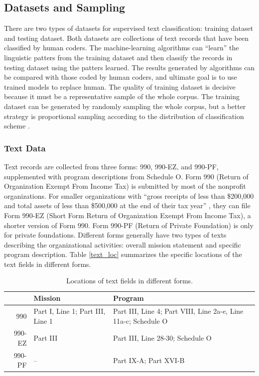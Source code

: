\documentclass[12pt]{article}
\begin{document}
\subsection{Datasets and Sampling}

There are two types of datasets for supervised text classification: training dataset and testing dataset. Both datasets are collections of text records that have been classified by human coders. The machine-learning algorithms can ``learn'' the linguistic patters from the training dataset and then classify the records in testing dataset using the patters learned. The results generated by algorithms can be compared with those coded by human coders, and ultimate goal is to use trained models to replace human. The quality of training dataset is decisive because it must be a representative sample of the whole corpus. The training dataset can be generated by randomly sampling the whole corpus, but a better strategy is proportional sampling according to the distribution of classification scheme \parencite[278]{GrimmerTextDataPromise2013}.

\subsubsection{Text Data}

Text records are collected from three forms: 990, 990-EZ, and 990-PF, supplemented with program descriptions from Schedule O. Form 990 (Return of Organization Exempt From Income Tax) is submitted by most of the nonprofit organizations. For smaller organizations with ``gross receipts of less than \$200,000 and total assets of less than \$500,000 at the end of their tax year'' \parencite[1]{USInternalRevenueService2017InstructionsForm2018}, they can file Form 990-EZ (Short Form Return of Organization Exempt From Income Tax), a shorter version of Form 990. Form 990-PF (Return of Private Foundation) is only for private foundations. Different forms generally have two types of texts describing the organizational activities: overall mission statement and specific program description. Table \ref{text_loc} summarizes the specific locations of the text fields in different forms.

\begin{table}[]
    \centering
    \begin{tabularx}{\textwidth}{r|X|X}
         & Mission & Program \\
         \hline
         990 & Part I, Line 1; Part III, Line 1 & Part III, Line 4; Part VIII, Line 2a-e, Line 11a-c; Schedule O \\
         990-EZ & Part III & Part III, Line 28-30; Schedule O \\
         990-PF & -- & Part IX-A; Part XVI-B \\
    \end{tabularx}
    \caption{Locations of text fields in different forms.} \label{text_loc}
    \label{tab:my_label}
\end{table}
\end{document}
